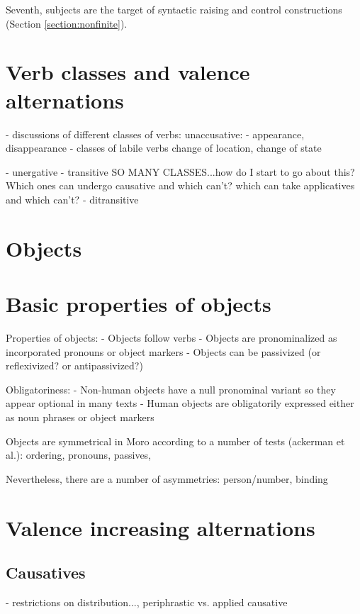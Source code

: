 Seventh, subjects are the target of syntactic raising and control constructions (Section \ref{section:nonfinite}). 

\section{Verb classes and valence alternations}\label{sec:ch12:verbs}

- discussions of different classes of verbs: unaccusative: 
- appearance, disappearance
- classes of labile verbs
 change of location, change of state

- unergative
- transitive
SO MANY CLASSES...how do I start to go about this? Which ones can undergo causative and which can't? which can take applicatives and which can't?
- ditransitive 


\section{Objects}\label{sec:ch12:objects}

\section{Basic properties of objects}

Properties of objects:
- Objects follow verbs
- Objects are pronominalized as incorporated pronouns or object markers
- Objects can be passivized (or reflexivized? or antipassivized?)

Obligatoriness:
- Non-human objects have a null pronominal variant so they appear optional in many texts
- Human objects are obligatorily expressed either as noun phrases or object markers

Objects are symmetrical in Moro according to a number of tests (ackerman et al.):
ordering, pronouns, passives, 

Nevertheless, there are a number of asymmetries: 
person/number, binding

\section{Valence increasing alternations}\label{sec:ch12:increasing}

\subsection{Causatives}\label{sec:ch12:applicative}

- restrictions on distribution..., periphrastic vs. applied causative

